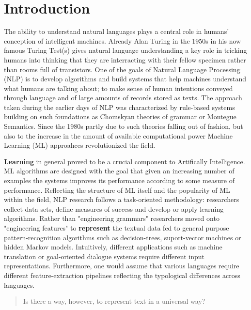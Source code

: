 
\chapter{Introduction}

The ability to understand natural languages plays a central role in humans' conception of intelligent machines.
Already Alan Turing in the 1950s in his now famous Turing Test(s) gives natural language understanding a 
key role in tricking humans into thinking that they are interracting with their fellow specimen rather 
than rooms full of transistors. One of the goals of Natural Language Processing (NLP) is to develop algorithms
and build systems that help machines understand what humans are talking about; to make sense of human 
intentions conveyed through language and of large amounts of records stored as texts. 
The approach taken during the earlier days of NLP was characterized by rule-based systems building on such 
foundations as Chomskyan theories of grammar or Montegue Semantics. 
Since the 1980s partly due to such theories falling out of fashion, but also to the increase in the amount 
of available computational power Machine Learning (ML) approahces revolutionized
the field. 

\textbf{Learning} in general proved to be a crucial component to Artifically Intelligence.
ML algorithms are designed with the goal that given an increasing 
number of examples the systems improves its performance according to some measure of performance.
Reflecting the structure of ML itself and the popularity of ML within the field, NLP research follows
a task-oriented methodology: researchers collect data sets, define measures of success and develop or
apply learning algorithms.
Rather than "engineering grammars" researchers moved onto "engineering features"
to \textbf{represent} the textual data fed to general purpose pattern-recognition algorithms such as
decision-trees, suport-vector machines or hidden Markov models. 
Intuitively, different applications such as machine translation or goal-oriented dialogue systems 
require different input representations. Furthermore, one would assume that various languages require 
different feature-extraction pipelines reflecting the typological differences across languages. 

\begin{quote}
Is there a way, however, to represent text in a universal way?
\end{quote}

